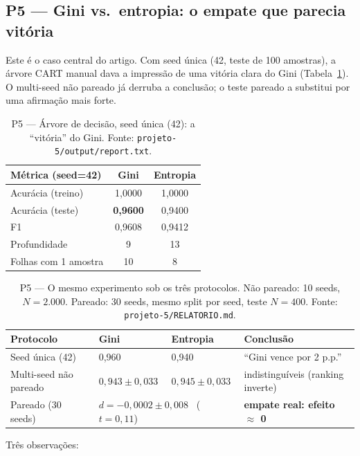 \documentclass[12pt]{article}
\begin{document}
\subsection{P5 --- Gini vs.\ entropia: o empate que parecia vitória}
\label{sec:res-p5}

Este é o caso central do artigo. Com seed única (42, teste de 100 amostras),
a árvore CART manual dava a impressão de uma vitória clara do Gini
(Tabela~\ref{tab:p5-single}). O multi-seed não pareado já derruba a
conclusão; o teste pareado a substitui por uma afirmação mais forte.

\begin{table}[htb]
\centering
\caption{P5 --- Árvore de decisão, seed única (42): a ``vitória'' do Gini.
Fonte: \texttt{projeto-5/output/report.txt}.}
\label{tab:p5-single}
\begin{tabular}{lcc}
\toprule
Métrica (seed=42) & Gini & Entropia \\
\midrule
Acurácia (treino) & 1{,}0000 & 1{,}0000 \\
Acurácia (teste)  & \textbf{0{,}9600} & 0{,}9400 \\
F1                & 0{,}9608 & 0{,}9412 \\
Profundidade      & 9        & 13 \\
Folhas com 1 amostra & 10    & 8 \\
\bottomrule
\end{tabular}
\end{table}

\begin{table}[htb]
\centering
\caption{P5 --- O mesmo experimento sob os três protocolos. Não pareado:
10 seeds, $N=2.000$. Pareado: 30 seeds, mesmo split por seed, teste $N=400$.
Fonte: \texttt{projeto-5/RELATORIO.md}.}
\label{tab:p5-proto}
\begin{tabular}{llll}
\toprule
Protocolo & Gini & Entropia & Conclusão \\
\midrule
Seed única (42)     & 0{,}960 & 0{,}940 & ``Gini vence por 2 p.p.'' \\
Multi-seed não pareado & $0{,}943 \pm 0{,}033$ & $0{,}945 \pm 0{,}033$ &
  indistinguíveis (ranking inverte) \\
Pareado (30 seeds)  & \multicolumn{2}{l}{$d = -0{,}0002 \pm 0{,}008$
  \ ($t = 0{,}11$)} & \textbf{empate real: efeito $\approx$ 0} \\
\bottomrule
\end{tabular}
\end{table}

Três observações:
\end{document}
